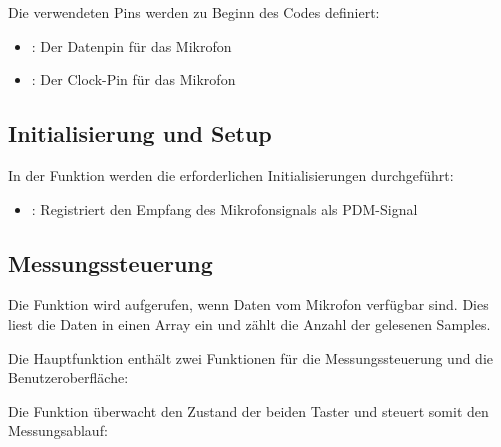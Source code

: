 Die verwendeten Pins werden zu Beginn des Codes definiert:

\begin{itemize}
    \item {}: Der Datenpin für das Mikrofon
    \item {}: Der Clock-Pin für das Mikrofon
\end{itemize}


\subsection{Initialisierung und Setup}

In der Funktion  werden die erforderlichen Initialisierungen durchgeführt:

\begin{itemize}
    \item {}: Registriert den Empfang des Mikrofonsignals als PDM-Signal
\end{itemize} 

\subsection{Messungssteuerung}

Die Funktion  wird aufgerufen, wenn Daten vom Mikrofon verfügbar sind. Dies liest die Daten in einen Array ein und zählt die Anzahl der gelesenen Samples.

{
    \label{TestMicrophone:ReadData}
}




Die Hauptfunktion  enthält zwei Funktionen für die Messungssteuerung und die Benutzeroberfläche:


{
    \label{TestMicrophone:Handle}
}


Die Funktion  überwacht den Zustand der beiden Taster und steuert somit den Messungsablauf:

{
    \label{TestMicrophone:Ueberwachung}
}


